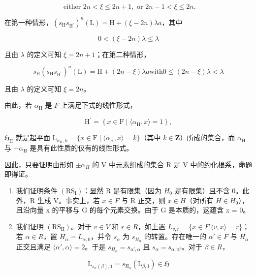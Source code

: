 \[
\text { either } 2 n <   \xi \leqslant 2 n + 1, \text { or } 2 n - 1 <   \xi \leqslant 2 n.
\]

在第一种情形，\((s_{\mathrm{H}}s_{\mathrm{H}^{\prime}})^{n}(\mathrm{L}) = \mathrm{H} + (\xi -2n)\lambda a\)，其中

\[
0 <   (\xi - 2 n) \lambda \leqslant \lambda
\]

且由 \(\lambda\) 的定义可知 \(\xi = 2n + 1\)；在第二种情形，

\[
s _ {\mathrm{H}} (s _ {\mathrm{H}} s _ {\mathrm {H^ {\prime}}}) ^ {n} (\mathrm{L}) = \mathrm{H} + (2 n - \xi) \lambda a \text {with} 0 \leqslant (2 n - \xi) \lambda <   \lambda
\]

且由 \(\lambda\) 的定义可知 \(\xi = 2n\)。

由此，若 \(\alpha_{\mathrm{H}}\) 是 \(F\) 上满足下式的线性形式，

\[
\mathrm{H} ^ {\prime} = \left\{x \in \mathrm{F} \mid \langle \alpha_ {\mathrm{H}}, x \rangle = 1 \right\},
\]

\(\mathfrak{H}_{\mathrm{H}}\) 就是超平面 \(\mathrm{L}_{\alpha_{\mathrm{H}},k} = \{x\in \mathrm{F}\mid \langle \alpha_{\mathrm{H}},x\rangle = k\}\)（其中 \(k\in \mathbf{Z}\)）所成的集合，而 \(\alpha_{\mathrm{H}}\) 与 \(-\alpha_{\mathrm{H}}\) 是具有此性质的仅有的线性形式。

因此，只要证明由形如 \(\pm\alpha_{H}\) 的 V 中元素组成的集合 R 是 V 中的约化根系，命题即得证。

\begin{enumerate}
\def\labelenumi{\alph{enumi})}
\item
  我们证明条件 \((\mathrm{RS}_{\mathrm{I}})\)：显然 R 是有限集（因为 \(H_{0}\) 是有限集）且不含 0。此外，R 生成 V。事实上，若 \(x \in F\) 与 R 正交，则 \(x \in H\)（对所有 \(H \in H_{0}\)），且沿向量 x 的平移与 G 的每个元素交换。由于 G 是本质的，这蕴含 x = 0。
\item
  我们证明 \((\mathrm{RS}_{\mathrm{II}})\)。对于 \(v \in V\) 和 \(r \in R\)，如上置 \(L_{v,r} = \{x \in F | \langle v, x \rangle = r\}\)；若 \(\alpha \in R\)，置 \(H_{\alpha} = L_{\alpha,0}\)，并令 \(s_{\alpha}\) 为 \(s_{H_{\alpha}}\) 的转置。存在唯一的 \(\alpha' \in F\) 与 \(H_{\alpha}\) 正交且满足 \(\langle \alpha', \alpha \rangle = 2\)。于是 \(s_{H_{\alpha}} = s_{\alpha', \alpha}\) 且 \(s_{\alpha} = s_{\alpha, \alpha'}\)。对于 \(\beta \in R\)，
\end{enumerate}

\[
\mathrm{L} _ {s _ {\alpha} (\beta), 1} = s _ {\mathrm{H} _ {\alpha}} \left(\mathrm{L} _ {\beta , 1}\right) \in \mathfrak {H}
\]

